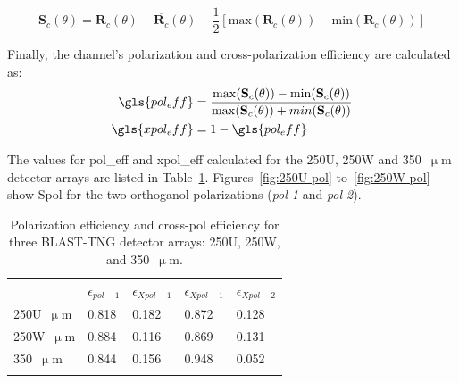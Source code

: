\begin{equation}
  \mathbf{S}_{c}(\theta) = \mathbf{R}_{c}(\theta) - \overline{\mathbf{R}_{c}}(\theta) + \frac{1}{2} \left[ \mathrm{max}\left( \mathbf{R}_{c}(\theta) \right) - \mathrm{min}\left( \mathbf{R}_{c}(\theta) \right) \right]
\end{equation}

Finally, the channel's polarization and cross-polarization efficiency are calculated as:
\begin{equation}
  \begin{aligned}
   \gls{pol_eff} &= \frac{ \mathrm{max}(\mathbf{S}_{c}(\theta)) - \mathrm{min}(\mathbf{S}_{c}(\theta)) }{ \mathrm{max}(\mathbf{S}_{c}(\theta)) + min(\mathbf{S}_{c}(\theta))} \\
   \gls{xpol_eff} &= 1 - \gls{pol_eff}
 \end{aligned}
\end{equation}

The values for \gls{pol_eff} and \gls{xpol_eff} calculated for the 250U, 250W and 350~$\upmu$m detector arrays are listed in Table~\ref{table:pol eff}. Figures~\ref{fig:250U pol} to~\ref{fig:250W pol} show \gls{Spol} for the two orthoganol polarizations (\textit{pol-1} and \textit{pol-2}).

\begin{table}[!htbp]
\centering
\begin{tabular}{@{}lllll@{}}
\dtoprule{}
 & $\epsilon_{pol-1}$ & $\epsilon_{Xpol-1}$ & $\epsilon_{Xpol-1}$ & $\epsilon_{Xpol-2}$ \\ \midrule
250U~$\upmu$m & 0.818 & 0.182 & 0.872 & 0.128 \\
250W~$\upmu$m & 0.884 & 0.116 & 0.869 & 0.131 \\
350~$\upmu$m & 0.844 & 0.156 & 0.948 & 0.052 \\ \dbottomrule{}
\\
\end{tabular}
\caption{Polarization efficiency  and cross-pol efficiency  for three BLAST-TNG detector arrays: 250U, 250W, and 350~$\upmu$m.}
\label{table:pol eff}
\end{table}

